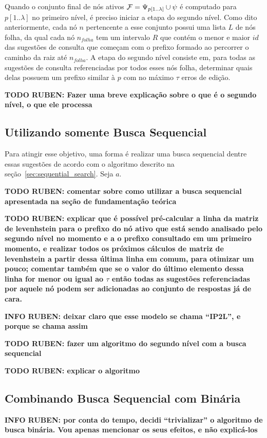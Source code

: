 Quando o conjunto final de nós ativos $\mathcal{F} = \Psi_{p[1..\lambda]} \cup \psi$ é computado para $p[1..\lambda]$ no primeiro nível, é preciso iniciar a etapa do segundo nível. Como dito anteriormente, cada nó $n$ pertencente a esse conjunto possui uma lista $L$ de nós folha, da qual cada nó $n_{folha}$ tem um intervalo $R$ que contém o menor e maior $id$ das sugestões de consulta que começam com o prefixo formado ao percorrer o caminho da raiz até $n_{folha}$. A etapa do segundo nível consiste em, para todas as sugestões de consulta referenciadas por todos esses nós folha, determinar quais delas possuem um prefixo similar à $p$ com no máximo $\tau$ erros de edição. 

\textbf{TODO RUBEN: Fazer uma breve explicação sobre o que é o segundo nível, o que ele processa}

\subsection{Utilizando somente Busca Sequencial} 

Para atingir esse objetivo, uma forma é realizar uma busca sequencial dentre essas sugestões de acordo com o algoritmo descrito na seção~\ref{sec:sequential_search}. Seja $a$.

\textbf{TODO RUBEN: comentar sobre como utilizar a busca sequencial apresentada na seção de fundamentação teórica}

\textbf{TODO RUBEN: explicar que é possível pré-calcular a linha da matriz de levenhstein para o prefixo do nó ativo que está sendo analisado pelo segundo nível no momento e a o prefixo consultado em um primeiro momento, e realizar todos os próximos cálculos de matriz de levenhstein a partir dessa última linha em comum, para otimizar um pouco; comentar também que se o valor do último elemento dessa linha for menor ou igual ao $\tau$ então todas as sugestões referenciadas por aquele nó podem ser adicionadas ao conjunto de respostas já de cara. }

\textbf{INFO RUBEN: deixar claro que esse modelo se chama ``IP2L'', e porque se chama assim}

\textbf{TODO RUBEN: fazer um algoritmo do segundo nível com a busca sequencial}

\textbf{TODO RUBEN: explicar o algoritmo}

\subsection{Combinando Busca Sequencial com Binária}
\textbf{INFO RUBEN: por conta do tempo, decidi ``trivializar'' o algoritmo de busca binária. Vou apenas mencionar os seus efeitos, e não explicá-los }


